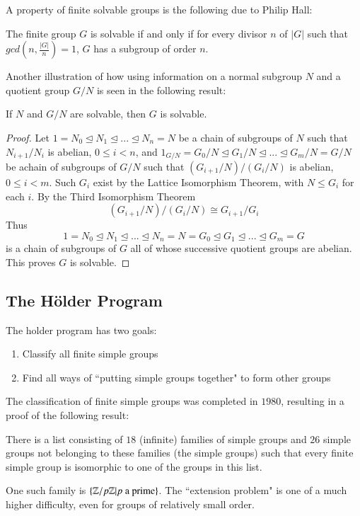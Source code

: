 A property of finite solvable groups is the following due to Philip Hall: 

\begin{thm}
    The finite group $G$ is solvable if and only if for every divisor $n$ of $|G|$ such that $gcd\left(n,\frac{|G|}{n}\right) = 1$, $G$ has a subgroup of order $n$.
\end{thm}

Another illustration of how using information on a normal subgroup $N$ and a quotient group $G/N$ is seen in the following result:

\begin{prop}
    If $N$ and $G/N$ are solvable, then $G$ is solvable.
\end{prop}
\begin{proof}
    Let $1 = N_0 \trianglelefteq N_1 \trianglelefteq ... \trianglelefteq N_n = N$ be a chain of subgroups of $N$ such that $N_{i+1}/N_i$ is abelian, $0 \leq i < n$, and $1_{G/N} = G_0/N\trianglelefteq G_1/N\trianglelefteq ... \trianglelefteq G_m/N = G/N$ be achain of subgroups of $G/N$ such that $(G_{i+1}/N)/(G_i/N)$ is abelian, $0 \leq i < m$. Such $G_i$ exist by the Lattice Isomorphism Theorem, with $N \leq G_i$ for each $i$. By the Third Isomorphism Theorem \begin{equation*}
        (G_{i+1}/N)/(G_i/N) \cong G_{i+1}/G_i
    \end{equation*}
    Thus \begin{equation*}
        1 = N_0 \trianglelefteq N_1 \trianglelefteq ... \trianglelefteq N_n = N = G_0 \trianglelefteq G_1 \trianglelefteq ... \trianglelefteq G_m = G
    \end{equation*}
    is a chain of subgroups of $G$ all of whose successive quotient groups are abelian. This proves $G$ is solvable.
\end{proof}





\subsection{The H\"{o}lder Program}

The holder program has two goals: \begin{enumerate}
    \item Classify all finite simple groups
    \item Find all ways of ``putting simple groups together" to form other groups
\end{enumerate}

The classification of finite simple groups was completed in $1980$, resulting in a proof of the following result:

\begin{thm}
    There is a list consisting of $18$ (infinite) families of simple groups and $26$ simple groups not belonging to these families (the  simple groups) such that every finite simple group is isomorphic to one of the groups in this list.
\end{thm}

One such family is $\{\mathbb Z/p\mathbb Z\vert p\text{ a prime}\}$. The ``extension problem" is one of a much higher difficulty, even for groups of relatively small order.

